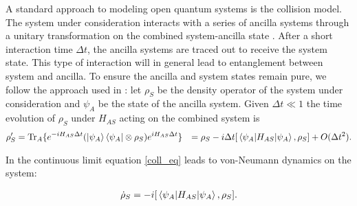 A standard approach to modeling open quantum systems is the collision model.
The system under consideration interacts with a series of ancilla systems through a unitary transformation on the combined system-ancilla state \cite{Lorenzo_2017}. After a short interaction time $\Delta t$, the ancilla systems are traced out to receive the system state.
This type of interaction will in general lead to entanglement between system and ancilla.
To ensure the ancilla and system states remain pure, we follow the approach used in \cite{beyer2020}:
let $\rho_S$ be the density operator of the system under consideration and $\psi_A$ be the state of the ancilla system.
Given $\Delta t \ll 1$ the time evolution of $\rho_S$ under $H_{AS}$ acting on the combined system is
\begin{align}\label{coll_eq}
\rho'_S & = \mathrm{Tr}_A \{ e^{-i H_{AS} \Delta t} (\ket{\psi_A} \bra{\psi_A} \otimes \rho_S) e^{i H_{AS} \Delta t} \} & = \rho_S - i \Delta t [\expval{H_{AS}}{\psi_A}, \rho_S] + O(\Delta t^2).
\end{align}

In the continuous limit equation \ref{coll_eq} leads to von-Neumann dynamics on the system:

\begin{align*}
	\dot{\rho}_S = - i [\expval{H_{AS}}{\psi_A}, \rho_S].
\end{align*}